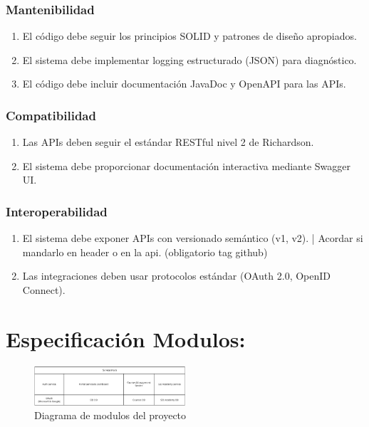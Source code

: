 \documentclass[11pt,a4paper]{article}
\newcommand{\reqnum}[1]{\textbf{\underline{RF-#1}}}
\begin{document}
\subsubsection{Mantenibilidad}
\begin{enumerate}[leftmargin=*,labelwidth=2.5cm,align=left,start=37]
	\item[\reqnum{037}] El código debe seguir los principios SOLID y patrones de diseño apropiados.
	\item[\reqnum{038}] El sistema debe implementar logging estructurado (JSON) para diagnóstico.
	\item[\reqnum{039}] El código debe incluir documentación JavaDoc y OpenAPI para las APIs.
\end{enumerate}

\subsubsection{Compatibilidad}
\begin{enumerate}[leftmargin=*,labelwidth=2.5cm,align=left,start=40]
	\item[\reqnum{040}] Las APIs deben seguir el estándar RESTful nivel 2 de Richardson.
	\item[\reqnum{041}] El sistema debe proporcionar documentación interactiva mediante Swagger UI.
\end{enumerate}

\subsubsection{Interoperabilidad}
\begin{enumerate}[leftmargin=*,labelwidth=2.5cm,align=left,start=44]
	\item[\reqnum{044}] El sistema debe exponer APIs con versionado semántico (v1, v2). | Acordar si mandarlo en header o en la api. (obligatorio tag github)
	\item[\reqnum{045}] Las integraciones deben usar protocolos estándar (OAuth 2.0, OpenID Connect).
\end{enumerate}



\section{Especificación Modulos:}

\begin{figure}[H]
	\centering
	\includegraphics[width=0.5\textwidth]{src/SID_microservices.pdf}
	\caption{Diagrama de modulos del proyecto}
\end{figure}
\end{document}
